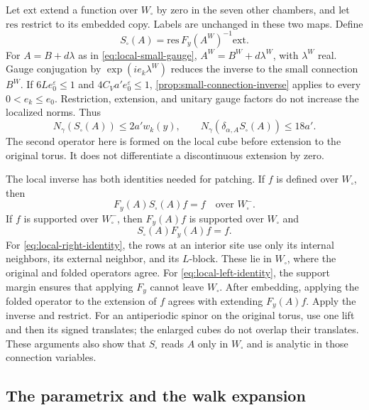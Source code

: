Let $\mathrm{ext}$ extend a function over $W_\square$ by zero in the
seven other chambers, and let $\mathrm{res}$ restrict to its embedded
copy. Labels are unchanged in these two maps. Define
\[
 S_\square(A)=\mathrm{res}\,F_y(A^W)^{-1}\mathrm{ext}.
\]
For $A=B+d\lambda$ as in \eqref{eq:local-small-gauge},
$A^W=B^W+d\lambda^W$, with $\lambda^W$ real. Gauge conjugation by
$\exp(ie_k\lambda^W)$ reduces the inverse to the small connection
$B^W$. If $6Le_0^\varepsilon\le1$ and
$4C_Va'e_0^\varepsilon\le1$, \cref{prop:small-connection-inverse}
applies to every $0<e_k\le e_0$. Restriction, extension, and unitary
gauge factors do not increase the localized norms. Thus
\begin{equation}\label{eq:local-inverse-bounds}
 N_\gamma(S_\square(A))\le2a'w_k(y),\qquad
 N_\gamma(\delta_{\alpha,A}S_\square(A))\le18a'.
\end{equation}
The second operator here is formed on the local cube before extension
to the original torus. It does not differentiate a discontinuous
extension by zero.

The local inverse has both identities needed for patching. If $f$ is
defined over $W_\square$, then
\begin{equation}\label{eq:local-right-identity}
 F_y(A)S_\square(A)f=f\quad\text{over }W_\square^-.
\end{equation}
If $f$ is supported over $W_\square^-$, then $F_y(A)f$ is supported
over $W_\square$ and
\begin{equation}\label{eq:local-left-identity}
 S_\square(A)F_y(A)f=f.
\end{equation}
For \eqref{eq:local-right-identity}, the rows at an interior site use
only its internal neighbors, its external neighbor, and its
$L$-block. These lie in $W_\square$, where the original and folded
operators agree. For \eqref{eq:local-left-identity}, the support
margin ensures that applying $F_y$ cannot leave $W_\square$.
After embedding, applying the folded operator to the extension of
$f$ agrees with extending $F_y(A)f$. Apply the inverse and restrict.
For an antiperiodic spinor on the original torus, use one lift and
then its signed translates; the enlarged cubes do not overlap their
translates. These arguments also show that $S_\square$ reads $A$
only in $W_\square$ and is analytic in those connection variables.

\subsection{The parametrix and the walk expansion}\label{subsec:propagator-walks}

